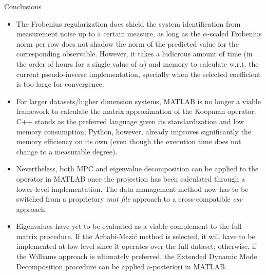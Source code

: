 \documentclass{beamer}
\begin{document}
\begin{frame}[allowframebreaks]{Conclusions}
    \begin{itemize}
        \item The Frobenius regularization does shield the system identification from measurement noise up to a certain measure, as long as the $\alpha$-scaled Frobenius norm per row does not shadow the norm of the predicted value for the corresponding observable. However, it takes a ludicrous amount of time (in the order of hours for a single value of $\alpha$) and memory to calculate w.r.t. the current pseudo-inverse implementation, specially when the selected coefficient is too large for convergence.
        \item For larger datasets/higher dimension systems, MATLAB is no longer a viable framework to calculate the matrix approximation of the Koopman operator. C++ stands as the preferred language given its standardization and low memory consumption; Python, however, already improves significantly the memory efficiency on its own (even though the execution time does not change to a measurable degree).
        \item Nevertheless, both MPC and eigenvalue decomposition can be applied to the operator in MATLAB once the projection has been calculated through a lower-level implementation. The data management method now has to be switched from a proprietary \textit{mat file} approach to a cross-compatible \textit{csv} approach.
        \item Eigenvalues have yet to be evaluated as a viable complement to the full-matrix procedure. If the Arbabi-Mezić method is selected, it will have to be implemented at low-level since it operates over the full dataset; otherwise, if the Williams approach is ultimately preferred, the Extended Dynamic Mode Decomposition procedure can be applied a-posteriori in MATLAB.
    \end{itemize}
\end{frame}
\end{document}
